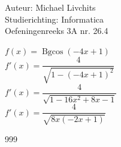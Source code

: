 \documentclass[a4paper]{article}
\newcommand{\Bgcos}{\operatorname{Bgcos}}
\begin{document}
  
\noindent \large Auteur: Michael Livchits \\
\noindent \large Studierichting: Informatica\\
\noindent \large Oefeningenreeks 3A nr. 26.4\\

\medskip

\normalsize

$f(x) = \Bgcos(-4x+1)$\\

$f'(x) = \dfrac{4}{\sqrt{1-(-4x+1)^2}}$\\

$f'(x) = \dfrac{4}{\sqrt{1-16x^2+8x-1}}$\\

$f'(x) = \dfrac{4}{\sqrt{8x(-2x+1)}}$\\

\begin{thebibliography}{999}
\end{thebibliography}
\end{document}
